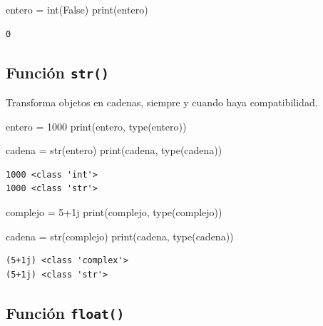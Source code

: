 \documentclass[
  spanish,
  letterpaper,
]{scrbook}
\newenvironment{Shaded}{\begin{snugshade}}{\end{snugshade}}
\newcommand{\BuiltInTok}[1]{\textcolor[rgb]{0.00,0.23,0.31}{#1}}
\newcommand{\DecValTok}[1]{\textcolor[rgb]{0.68,0.00,0.00}{#1}}
\newcommand{\NormalTok}[1]{\textcolor[rgb]{0.00,0.23,0.31}{#1}}
\newcommand{\OperatorTok}[1]{\textcolor[rgb]{0.37,0.37,0.37}{#1}}
\newcommand{\OtherTok}[1]{\textcolor[rgb]{0.00,0.23,0.31}{#1}}
\newcommand{\VariableTok}[1]{\textcolor[rgb]{0.07,0.07,0.07}{#1}}
\theoremstyle{definition}
\theoremstyle{remark}
\begin{document}
\begin{Shaded}
\begin{Highlighting}[]
\NormalTok{entero }\OperatorTok{=} \BuiltInTok{int}\NormalTok{(}\VariableTok{False}\NormalTok{) }
\BuiltInTok{print}\NormalTok{(entero)}
\end{Highlighting}
\end{Shaded}

\begin{verbatim}
0
\end{verbatim}

\subsection{\texorpdfstring{Función
\texttt{str()}}{Función str()}}\label{funciuxf3n-str}

Transforma objetos en cadenas, siempre y cuando haya compatibilidad.

\begin{Shaded}
\begin{Highlighting}[]
\NormalTok{entero }\OperatorTok{=} \DecValTok{1000}
\BuiltInTok{print}\NormalTok{(entero, }\BuiltInTok{type}\NormalTok{(entero))}

\NormalTok{cadena }\OperatorTok{=} \BuiltInTok{str}\NormalTok{(entero) }
\BuiltInTok{print}\NormalTok{(cadena, }\BuiltInTok{type}\NormalTok{(cadena))}
\end{Highlighting}
\end{Shaded}

\begin{verbatim}
1000 <class 'int'>
1000 <class 'str'>
\end{verbatim}

\begin{Shaded}
\begin{Highlighting}[]
\NormalTok{complejo }\OperatorTok{=} \DecValTok{5}\OperatorTok{+}\OtherTok{1j}
\BuiltInTok{print}\NormalTok{(complejo, }\BuiltInTok{type}\NormalTok{(complejo))}

\NormalTok{cadena }\OperatorTok{=} \BuiltInTok{str}\NormalTok{(complejo)}
\BuiltInTok{print}\NormalTok{(cadena, }\BuiltInTok{type}\NormalTok{(cadena))}
\end{Highlighting}
\end{Shaded}

\begin{verbatim}
(5+1j) <class 'complex'>
(5+1j) <class 'str'>
\end{verbatim}

\subsection{\texorpdfstring{Función
\texttt{float()}}{Función float()}}\label{funciuxf3n-float}
\end{document}
